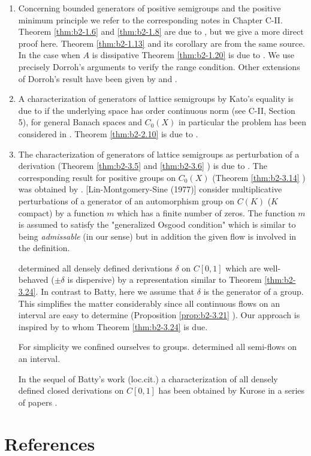 \begin{enumerate}[label=\emph{Section \arabic*:}, wide]

\item
Concerning bounded generators of positive semigroups and the positive minimum principle we refer to the corresponding notes in Chapter C-II.
Theorem \ref{thm:b2-1.6} and \ref{thm:b2-1.8} are due to \citet{arendtchernoffkato:1982}, but we give a more direct proof here.
Theorem \ref{thm:b2-1.13} and its corollary are from the same source.
In the case when $A$ is dissipative Theorem \ref{thm:b2-1.20} is due to \citet{dorroh:1966}.
We use precisely Dorroh's arguments to verify the range condition.
Other extensions of Dorroh's result have been given by \citet{lumer:1974} and \citet{lumer:1975}.

\item 
A characterization of generators of lattice semigroups by Kato's equality is due to  \citet{nageluhlig:1981} if the underlying space has order continuous norm (see C-II, Section 5), for general Banach spaces and $C_{0}(X)$ in particular the problem has been considered in \citet{arendt:1982}.
Theorem \ref{thm:b2-2.10} is due to \citet{uhlig:1979}.

\item
The characterization of generators of lattice semigroups as perturbation of a derivation (Theorem \ref{thm:b2-3.5} and \ref{thm:b2-3.6} ) is due to \citet{derndingernagel:1979}.
The corresponding result for positive groups on $C_{0}(X)$ (Theorem \ref{thm:b2-3.14} ) was obtained by \citet{arendtgreiner:1984}.
\citet{linetal:1977} [Lin-Montgomery-Sine (1977)] 
consider multiplicative perturbations of a generator of an automorphism group on $C(K)$ ($K$ compact) by a function $m$ which has a finite number of zeros.
The function $m$ is assumed to satisfy the "generalized Osgood condition" which is similar to being \emph{admissable} (in our sense) but in addition the given flow is involved in the definition.

\citet{batty:1981} determined all densely defined derivations $\delta$ on $C[0,1]$ which are well-behaved (\ie  $\pm\delta$ is dispersive) by a representation similar to Theorem \ref{thm:b2-3.24}.
In contrast to Batty, here we assume that $\delta$ is the generator of a group.
This simplifies the matter considerably since all continuous flows on an interval are easy to determine (Proposition \ref{prop:b2-3.21} ).
Our approach is inspired by \citet{delaubenfels:1984} to whom Theorem \ref{thm:b2-3.24} is due.

For simplicity we confined ourselves to groups.
\citet{uhlig:1979} determined all semi-flows on an interval.

In the sequel of Batty's work (loc.cit.) a characterization of all densely defined closed derivations on $C[0,1]$ has been obtained by Kurose in a series of papers 
\citet{kurose:1981, kurose:1982, kurose:1983}.
\end{enumerate}

\section*{References}
{\RaggedRight
\renewcommand{\bibsection}{}

}

